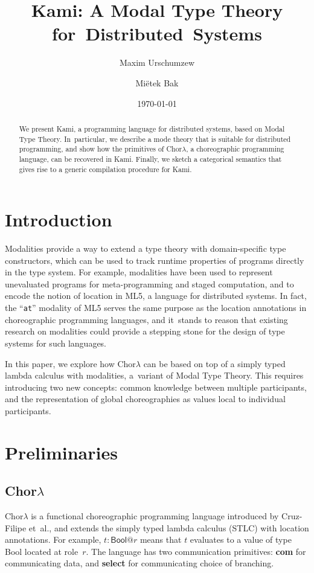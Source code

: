 \documentclass{scrartcl}
\title{Kami: A Modal Type Theory for~Distributed~Systems}
\author{
  Maxim Urschumzew
  \emailhref{mxmurw@determi.io}
  \and
  Miëtek Bak
  \emailhref{mietek@bak.io}
}
\date{\today}
\theoremstyle{definition}
\theoremstyle{plain}
\newcommand{\primitive}[1]{\textsf{\textbf{#1}}}
\begin{document}
\maketitle
\begin{abstract}
  \noindent
  We present Kami, a programming language for distributed systems, based on
  Modal Type Theory. In~particular, we describe a mode theory that is suitable
  for distributed programming, and show how the primitives of Chor$\lambda$, a
  choreographic programming language, can be recovered in Kami. Finally, we
  sketch a categorical semantics that gives rise to a generic compilation
  procedure for Kami.
\end{abstract}



\section{Introduction}
Modalities provide a way to extend a type theory with domain-specific type
constructors, which can be used to track runtime properties of programs
directly in the type system. For example, modalities have been used to
represent unevaluated programs for meta-programming\cite{bak2020self} and
staged computation\cite{davies2001modal}, and to encode the notion of location
in ML5, a language for distributed systems\cite{murphy2008modal}. In fact, the
``\texttt{at}'' modality of ML5 serves the same purpose as the location
annotations in choreographic programming languages\cite{cruz2022functional,
giallorenzo2024choral}, and it~stands to reason that existing research on
modalities could provide a stepping stone for the design of type systems for
such languages.

In this paper, we explore how Chor$\lambda$\cite{cruz2022functional} can be
based on top of a simply typed lambda calculus with modalities, a~variant of
Modal Type Theory\cite{gratzer2023syntax}. This requires introducing two new
concepts: common knowledge between multiple participants, and the
representation of global choreographies as values local to individual
participants.



\section{Preliminaries}
\subsection{\texorpdfstring{Chor$\lambda$}{ChorLambda}}
Chor$\lambda$ is a functional choreographic programming language introduced by
Cruz-Filipe et~al.\cite{cruz2022functional}, and extends the simply typed
lambda calculus (STLC) with location annotations. For example, $t :
\textsf{Bool} @r$ means that $t$ evaluates to a value of type \textsf{Bool}
located at role~$r$. The language has two communication primitives:
\primitive{com} for communicating data, and \primitive{select} for
communicating choice of branching.
\end{document}
